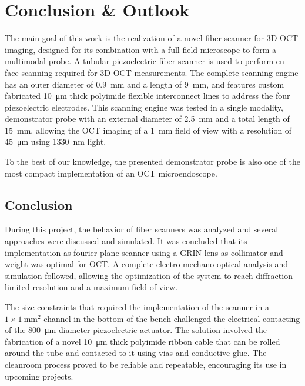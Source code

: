 %
\chapter{Conclusion \& Outlook}


The main goal of this work is the realization of a novel fiber scanner for 3D OCT imaging, designed for its combination with a full field microscope to form a multimodal probe. A tubular piezoelectric fiber scanner is used to perform en face scanning required for 3D OCT measurements. The complete scanning engine has an outer diameter of \SI{0.9}{\milli\meter} and a length of \SI{9}{\milli\meter}, and features custom fabricated \SI{10}{\micro\meter} thick polyimide flexible interconnect lines to address the four piezoelectric electrodes. This scanning engine was tested in a single modality, demonstrator probe with an external diameter of \SI{2.5}{\milli\meter} and a total length of \SI{15}{\milli\meter}, allowing the OCT imaging of a \SI{1}{\milli\meter} field of view with a resolution of \SI{45}{\micro\meter} using \SI{1330}{\nano\meter} light. 

To the best of our knowledge, the presented demonstrator probe is also one of the most compact implementation of an OCT microendoscope.

\section{Conclusion}
During this project, the behavior of fiber scanners was analyzed and several approaches were discussed and simulated. It was concluded that its implementation as fourier plane scanner using a GRIN lens as collimator and weight was optimal for OCT. A complete electro-mechano-optical analysis and simulation followed, allowing the optimization of the system to reach diffraction-limited resolution and a maximum field of view.

The size constraints that required the implementation of the scanner in a $1\times \SI{1}{\milli\meter^2}$ channel in the bottom of the bench challenged the electrical contacting of the \SI{800}{\micro\meter} diameter piezoelectric actuator. The solution involved the fabrication of a novel \SI{10}{\micro\meter} thick polyimide ribbon cable that can be rolled around the tube and contacted to it using vias and conductive glue. The cleanroom process proved to be reliable and repeatable, encouraging its use in upcoming projects.

